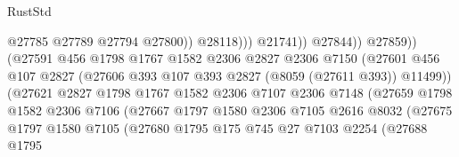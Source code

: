 \begin{lexlean}{RustStd}
\begin{coremodule}
                                                      @27785
                                                      @27789
                                                      @27794
                                                      @27800))
                                                  @28118)))
                                            @21741))
                                        @27844))
                                    @27859))
                                (@27591
                                  @456
                                  @1798
                                  @1767
                                  @1582
                                  @2306
                                  @2827
                                  @2306
                                  @7150
                                  (@27601
                                    @456
                                    @107
                                    @2827
                                    (@27606 @393 @107 @393 @2827 (@8059 (@27611 @393)) @11499))
                                  (@27621
                                    @2827
                                    @1798
                                    @1767
                                    @1582
                                    @2306
                                    @7107
                                    @2306
                                    @7148
                                    (@27659
                                      @1798
                                      @1582
                                      @2306
                                      @7106
                                      (@27667
                                        @1797
                                        @1580
                                        @2306
                                        @7105
                                        @2616
                                        @8032
                                        (@27675
                                          @1797
                                          @1580
                                          @7105
                                          (@27680
                                            @1795
                                            @175
                                            @745
                                            @27
                                            @7103
                                            @2254
                                            (@27688
                                              @1795

\end{coremodule}
\end{lexlean}
